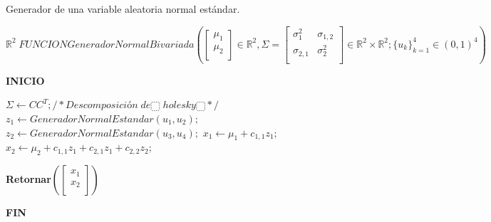 \begin{algorithm}
    \caption{Generador de una variable aleatoria normal estándar.}
    \label{alg:1-3}
    \textbf{$\mathbb{R}^2\;FUNCIONGeneradorNormalBivariada([\begin{matrix}\mu_1\\\mu_2\\\end{matrix}]\in\mathbb{R}^2,\Sigma=[\begin{matrix}\sigma_1^2&\sigma_{1,2}\\\sigma_{2,1}&\sigma_2^2\\\end{matrix}]\in\mathbb{R}^2\times\mathbb{R}^2;\{u_k\}_{k=1}^4\in(0,1)^4)$}
    \begin{flushleft}
    \textbf{INICIO}\\
    \end{flushleft}
    
    \begin{algorithmic}
    
    
    \State $\Sigma\gets CC^T;/*Descomposición\;de⬚\;holesky⬚*/$
    \State $z_1\gets GeneradorNormalEstandar\left(u_1,u_2\right);$
    \State $z_2\gets GeneradorNormalEstandar\left(u_3,u_4\right);$
    \State $x_1\gets\mu_1+c_{1,1}z_1;$
    \State $x_2\gets\mu_2+c_{1,1}z_1+c_{2,1}z_1+c_{2,2}z_2;$
    \begin{flushleft}
    \textbf{Retornar$(\left[\begin{matrix}x_1\\x_2\\\end{matrix}\right])$}
    \end{flushleft}
    
       
    \end{algorithmic}
    \begin{flushleft}
    \textbf{FIN}
    \end{flushleft}
\end{algorithm}




